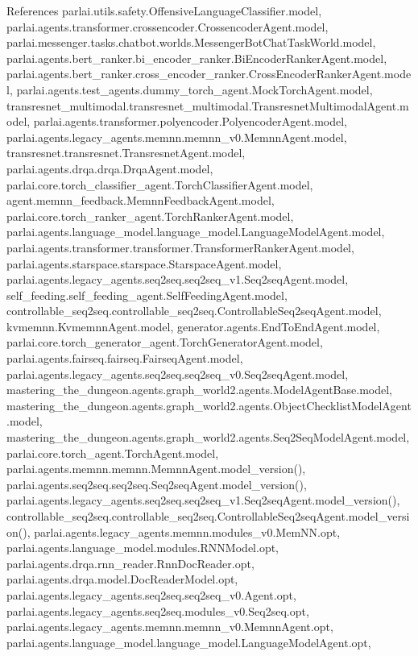 References parlai.\+utils.\+safety.\+Offensive\+Language\+Classifier.\+model, parlai.\+agents.\+transformer.\+crossencoder.\+Crossencoder\+Agent.\+model, parlai.\+messenger.\+tasks.\+chatbot.\+worlds.\+Messenger\+Bot\+Chat\+Task\+World.\+model, parlai.\+agents.\+bert\+\_\+ranker.\+bi\+\_\+encoder\+\_\+ranker.\+Bi\+Encoder\+Ranker\+Agent.\+model, parlai.\+agents.\+bert\+\_\+ranker.\+cross\+\_\+encoder\+\_\+ranker.\+Cross\+Encoder\+Ranker\+Agent.\+model, parlai.\+agents.\+test\+\_\+agents.\+dummy\+\_\+torch\+\_\+agent.\+Mock\+Torch\+Agent.\+model, transresnet\+\_\+multimodal.\+transresnet\+\_\+multimodal.\+Transresnet\+Multimodal\+Agent.\+model, parlai.\+agents.\+transformer.\+polyencoder.\+Polyencoder\+Agent.\+model, parlai.\+agents.\+legacy\+\_\+agents.\+memnn.\+memnn\+\_\+v0.\+Memnn\+Agent.\+model, transresnet.\+transresnet.\+Transresnet\+Agent.\+model, parlai.\+agents.\+drqa.\+drqa.\+Drqa\+Agent.\+model, parlai.\+core.\+torch\+\_\+classifier\+\_\+agent.\+Torch\+Classifier\+Agent.\+model, agent.\+memnn\+\_\+feedback.\+Memnn\+Feedback\+Agent.\+model, parlai.\+core.\+torch\+\_\+ranker\+\_\+agent.\+Torch\+Ranker\+Agent.\+model, parlai.\+agents.\+language\+\_\+model.\+language\+\_\+model.\+Language\+Model\+Agent.\+model, parlai.\+agents.\+transformer.\+transformer.\+Transformer\+Ranker\+Agent.\+model, parlai.\+agents.\+starspace.\+starspace.\+Starspace\+Agent.\+model, parlai.\+agents.\+legacy\+\_\+agents.\+seq2seq.\+seq2seq\+\_\+v1.\+Seq2seq\+Agent.\+model, self\+\_\+feeding.\+self\+\_\+feeding\+\_\+agent.\+Self\+Feeding\+Agent.\+model, controllable\+\_\+seq2seq.\+controllable\+\_\+seq2seq.\+Controllable\+Seq2seq\+Agent.\+model, kvmemnn.\+Kvmemnn\+Agent.\+model, generator.\+agents.\+End\+To\+End\+Agent.\+model, parlai.\+core.\+torch\+\_\+generator\+\_\+agent.\+Torch\+Generator\+Agent.\+model, parlai.\+agents.\+fairseq.\+fairseq.\+Fairseq\+Agent.\+model, parlai.\+agents.\+legacy\+\_\+agents.\+seq2seq.\+seq2seq\+\_\+v0.\+Seq2seq\+Agent.\+model, mastering\+\_\+the\+\_\+dungeon.\+agents.\+graph\+\_\+world2.\+agents.\+Model\+Agent\+Base.\+model, mastering\+\_\+the\+\_\+dungeon.\+agents.\+graph\+\_\+world2.\+agents.\+Object\+Checklist\+Model\+Agent.\+model, mastering\+\_\+the\+\_\+dungeon.\+agents.\+graph\+\_\+world2.\+agents.\+Seq2\+Seq\+Model\+Agent.\+model, parlai.\+core.\+torch\+\_\+agent.\+Torch\+Agent.\+model, parlai.\+agents.\+memnn.\+memnn.\+Memnn\+Agent.\+model\+\_\+version(), parlai.\+agents.\+seq2seq.\+seq2seq.\+Seq2seq\+Agent.\+model\+\_\+version(), parlai.\+agents.\+legacy\+\_\+agents.\+seq2seq.\+seq2seq\+\_\+v1.\+Seq2seq\+Agent.\+model\+\_\+version(), controllable\+\_\+seq2seq.\+controllable\+\_\+seq2seq.\+Controllable\+Seq2seq\+Agent.\+model\+\_\+version(), parlai.\+agents.\+legacy\+\_\+agents.\+memnn.\+modules\+\_\+v0.\+Mem\+N\+N.\+opt, parlai.\+agents.\+language\+\_\+model.\+modules.\+R\+N\+N\+Model.\+opt, parlai.\+agents.\+drqa.\+rnn\+\_\+reader.\+Rnn\+Doc\+Reader.\+opt, parlai.\+agents.\+drqa.\+model.\+Doc\+Reader\+Model.\+opt, parlai.\+agents.\+legacy\+\_\+agents.\+seq2seq.\+seq2seq\+\_\+v0.\+Agent.\+opt, parlai.\+agents.\+legacy\+\_\+agents.\+seq2seq.\+modules\+\_\+v0.\+Seq2seq.\+opt, parlai.\+agents.\+legacy\+\_\+agents.\+memnn.\+memnn\+\_\+v0.\+Memnn\+Agent.\+opt, parlai.\+agents.\+language\+\_\+model.\+language\+\_\+model.\+Language\+Model\+Agent.\+opt, 